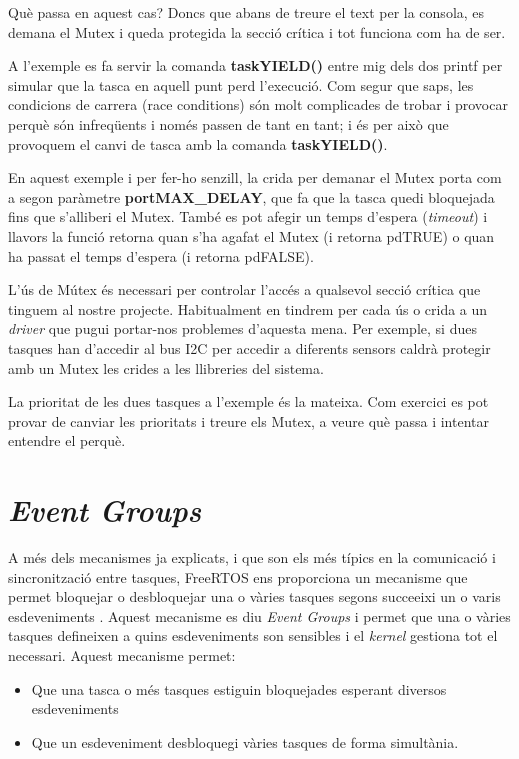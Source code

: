 Què passa en aquest cas? Doncs que abans de treure el text per la consola, es demana el Mutex i queda protegida la secció crítica i tot funciona com ha de ser.

A l'exemple es fa servir la comanda {\bf taskYIELD()} entre mig dels dos printf per simular que la tasca en aquell punt perd l'execució. Com segur que saps, les condicions de carrera (\glspl{race condition}) són molt complicades de trobar i provocar perquè són infreqüents i només passen de tant en tant; i és per això que provoquem el canvi de tasca amb la comanda {\bf taskYIELD()}.

En aquest exemple i per fer-ho senzill, la crida per demanar el Mutex porta com a segon paràmetre {\bf portMAX\_DELAY}, que fa que la tasca quedi bloquejada fins que s'alliberi el Mutex. També es pot afegir un temps d'espera ({\em timeout}) i llavors la funció retorna quan s'ha agafat el Mutex (i retorna \gls{pdTRUE}) o quan ha passat el temps d'espera (i retorna \gls{pdFALSE}).

L'ús de Mútex és necessari per controlar l'accés a qualsevol secció crítica que tinguem al nostre projecte. Habitualment en tindrem per cada ús o crida a un {\em driver} que pugui portar-nos problemes d'aquesta mena. Per exemple, si dues tasques han d'accedir al bus \gls{I2C} per accedir a diferents sensors caldrà protegir amb un Mutex les crides a les llibreries del sistema.

\begin{exercise}
La prioritat de les dues tasques a l'exemple és la mateixa. Com exercici es pot provar de canviar les prioritats i treure els Mutex, a veure què passa i intentar entendre el perquè.
\end{exercise}


\section{\em Event Groups}
A més dels mecanismes ja explicats, i que son els més típics en la comunicació i sincronització entre tasques, FreeRTOS ens proporciona un mecanisme que permet bloquejar o desbloquejar una o vàries tasques segons succeeixi un o varis esdeveniments \cite[266]{FreeRTOSBook}. Aquest mecanisme es diu {\em Event Groups} i permet que una o vàries tasques defineixen a quins esdeveniments son sensibles  i el {\em kernel} gestiona tot el necessari. Aquest mecanisme permet:
\begin{itemize}
 \item Que una tasca o més tasques estiguin bloquejades esperant diversos esdeveniments
 \item Que un esdeveniment desbloquegi vàries tasques de forma simultània.
\end{itemize}

